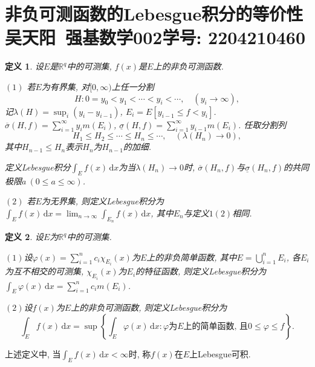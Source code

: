 \documentclass[12pt, a4paper, oneside]{ctexart}
\newcommand{\xiaosihao}{\fontsize{12pt}{\baselineskip}\selectfont}  %
\newtheorem{definition}{定义}
\numberwithin{equation}{section}  %
\let\leq=\leqslant %
\def\R{\mathbb{R}}          %
\def\d{\mathrm{d}}          %
\def\ol{\overline}          %
\def\ul{\underline}         %
\def\add{\vspace{1ex}}      %
\begin{document}
\section*{非负可测函数的Lebesgue积分的等价性\\
{\xiaosihao 吴天阳\ 强基数学002\quad 学号: 2204210460}
}


\begin{definition}
    设$E$是$\R^q$中的可测集, $f(x)$是$E$上的非负可测函数.

    $(1)$ 若$E$为有界集, 对$[0,\infty)$上任一分割
    \begin{equation*}
        H:0=y_0<y_1<\cdots<y_i<\cdots,\quad (y_i\to\infty),
    \end{equation*}
    记$\lambda(H) = \sup_i(y_i-y_{i-1})$, $E_i = E[y_{i-1}\leq f<y_i]$. $\ol{\sigma}(H,f) = \sum_{i=1}^\infty y_im(E_i)$, $\ul{\sigma}(H, f) = \sum_{i=1}^\infty y_{i-1}m(E_i)$. 任取分割列
    \begin{equation*}
        H_1\leq H_2\leq \cdots\leq H_n\leq \cdots,\quad(\lambda(H_n)\to 0),
    \end{equation*}
    其中$H_{n-1}\leq H_n$表示$H_n$为$H_{n-1}$的加细.\add

    定义Lebesgue积分$\int_Ef(x)\,\d x$为当$\lambda(H_n)\to 0$时, $\ol{\sigma}(H_n,f)$与$\ul{\sigma}(H_n,f)$的共同极限$a\ (0\leq a\leq \infty)$.

    $(2)$ 若$E$为无界集, 则定义Lebesgue积分为$\int_Ef(x)\,\d x = \lim_{n\to\infty}\int_{E_n}f(x)\,\d x$, 其中$E_n$与定义$1(2)$相同.
\end{definition}
\begin{definition}
    设$E$为$\R^q$中的可测集.

    $(1)$设$\varphi(x)=\sum_{i=1}^nc_i\chi_{E_i}(x)$为$E$上的非负简单函数, 其中$E = \bigcup_{i=1}^nE_i$, 各$E_i$为互不相交的可测集, $\chi_{E_i}(x)$为$E_i$的特征函数, 则定义Lebesgue积分为$\int_{E}\varphi(x)\,\d x=\sum_{i=1}^nc_im(E_i)$.

    $(2)$设$f(x)$为$E$上的非负可测函数, 则定义Lebesgue积分为
    \begin{equation*}
        \int_Ef(x)\,\d x=\sup\left\{\int_E\varphi(x)\,\d x:\varphi\text{为}E\text{上的简单函数, 且}0\leq \varphi\leq f\right\}.
    \end{equation*}
\end{definition}
上述定义中, 当$\int_Ef(x)\,\d x < \infty$时, 称$f(x)$在$E$上Lebesgue可积.
\end{document}
